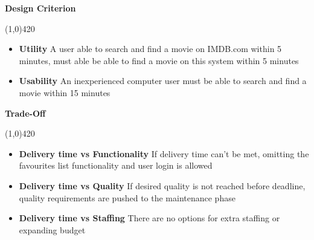 \vspace{0.5cm}

\textbf{Design Criterion}
\vspace{-1.1cm}
\begin{center}
\line(1,0){420}
\end{center}
\begin{itemize}
\item \textbf{Utility} A user able to search and find a movie on IMDB.com within 5 minutes, must able be able to find a movie on this system within 5 minutes
\item \textbf{Usability} An inexperienced computer user must be able to search and find a movie within 15 minutes
\end{itemize}

\vspace{0.5cm}

\textbf{Trade-Off}
\vspace{-1.1cm}
\begin{center}
\line(1,0){420}
\end{center}
\begin{itemize}
\item\textbf{Delivery time vs Functionality} If delivery time can't be met, omitting the favourites list functionality and user login is allowed
\item\textbf{Delivery time vs Quality} If desired quality is not reached before deadline, quality requirements are pushed to the maintenance phase
\item\textbf{Delivery time vs Staffing} There are no options for extra staffing or expanding budget
\end{itemize}





